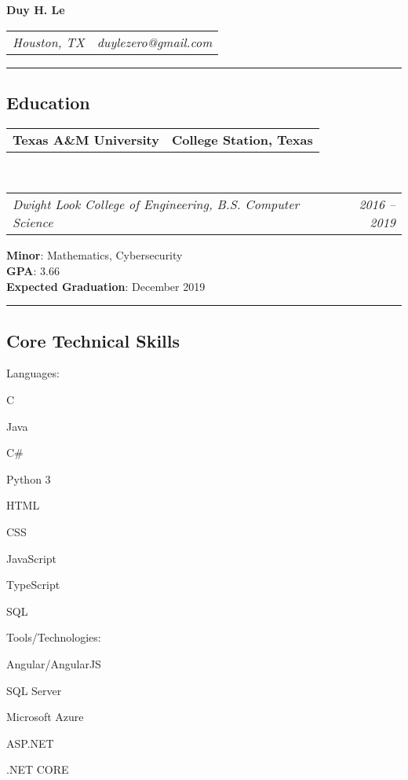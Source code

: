 \documentclass[10pt,letterpaper]{article}
\makeatletter
\newenvironment{indentsection}[1]%
{\begin{list}{}%
	{\setlength{\leftmargin}{#1}}%
	\item[]%
}
{\end{list}}
\newcommand{\headerrow}[2]
{\begin{tabular*}{\linewidth}{l@{\extracolsep{\fill}}r}
	#1 &
	#2 \\
\end{tabular*}}
\newcommand{\CPP}
{C\nolinebreak[4]\hspace{-.05em}\raisebox{.22ex}{\footnotesize\bf ++}}
\makeatother
\begin{document}
\begin{center}
{\LARGE \textbf{Duy H. Le}}
\end{center}
	\headerrow
		{\emph{Houston, TX}}
		{\emph{duylezero@gmail.com}}
\hrule
\vspace{-0.8em}
\subsection*{Education}

	\headerrow
		{\textbf{Texas A\&M University}}
		{\textbf{College Station, Texas}}
	\\
	\headerrow
		{\emph{Dwight Look College of Engineering, B.S. Computer Science}}
		{\emph{2016 -- 2019}}
	\begin{indentsection}{\parindent}
	\vspace{-0.4em}
		 \textbf{Minor}: Mathematics, Cybersecurity \\
		 \textbf{GPA}: 3.66 \\
		\textbf{Expected Graduation}: December 2019
	\end{indentsection}

\hrule
\vspace{-0.8em}
\subsection*{Core Technical Skills}
\vspace{-0.4em}
\begin{indentsection}{\parindent}
\begin{description*}
	\item[Languages:]
	\begin{inparaitem}[\ * \ ]
 		\CPP \ 
		\item Java
		\item C\#
		\item Python 3
		\item HTML
		\item CSS
		\item JavaScript
		\item TypeScript
		\item SQL
	\end{inparaitem}
	\item[Tools/Technologies:]
		\begin{inparaitem}[\ * \ ]
 		 Angular/AngularJS \
		\item SQL Server
		\item Microsoft Azure
		\item ASP.NET
		\item .NET CORE
	\end{inparaitem}
\end{description*}
\end{indentsection}
\end{document}
